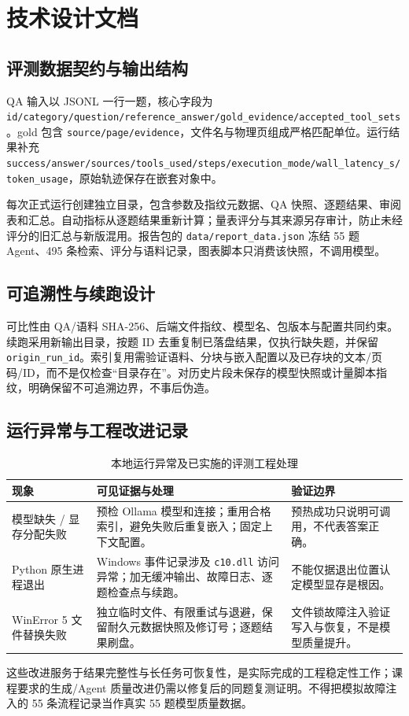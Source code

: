 \documentclass[UTF8,a4paper,zihao=-4,fontset=none]{ctexart}
\newcommand{\code}[1]{{\small\nolinkurl{#1}}}
\begin{document}
\section{技术设计文档}
\subsection{评测数据契约与输出结构}
QA 输入以 JSONL 一行一题，核心字段为 \code{id/category/question/reference_answer/gold_evidence/accepted_tool_sets}。gold 包含 \code{source/page/evidence}，文件名与物理页组成严格匹配单位。运行结果补充 \code{success/answer/sources/tools_used/steps/execution_mode/wall_latency_s/token_usage}，原始轨迹保存在嵌套对象中。

每次正式运行创建独立目录，包含参数及指纹元数据、QA 快照、逐题结果、审阅表和汇总。自动指标从逐题结果重新计算；量表评分与其来源另存审计，防止未经评分的旧汇总与新版混用。报告包的 \code{data/report_data.json} 冻结 55 题 Agent、495 条检索、评分与语料记录，图表脚本只消费该快照，不调用模型。

\subsection{可追溯性与续跑设计}
可比性由 QA/语料 SHA-256、后端文件指纹、模型名、包版本与配置共同约束。续跑采用新输出目录，按题 ID 去重复制已落盘结果，仅执行缺失题，并保留 \code{origin_run_id}。索引复用需验证语料、分块与嵌入配置以及已存块的文本/页码/ID，而不是仅检查“目录存在”。对历史片段未保存的模型快照或计量脚本指纹，明确保留不可追溯边界，不事后伪造。

\subsection{运行异常与工程改进记录}
\begin{table}[H]\caption{本地运行异常及已实施的评测工程处理}\small\centering
\begin{tabularx}{\linewidth}{@{}L{27mm}Y Y@{}}\toprule 现象 & 可见证据与处理 & 验证边界\\\midrule
模型缺失 / 显存分配失败 & 预检 Ollama 模型和连接；重用合格索引，避免失败后重复嵌入；固定上下文配置。 & 预热成功只说明可调用，不代表答案正确。\\
Python 原生进程退出 & Windows 事件记录涉及 \code{c10.dll} 访问异常；加无缓冲输出、故障日志、逐题检查点与续跑。 & 不能仅据退出位置认定模型显存是根因。\\
WinError 5 文件替换失败 & 独立临时文件、有限重试与退避，保留耐久元数据快照及修订号；逐题结果刷盘。 & 文件锁故障注入验证写入与恢复，不是模型质量提升。\\\bottomrule\end{tabularx}
\end{table}
这些改进服务于结果完整性与长任务可恢复性，是实际完成的工程稳定性工作；课程要求的生成/Agent 质量改进仍需以修复后的同题复测证明。不得把模拟故障注入的 55 条流程记录当作真实 55 题模型质量数据。
\end{document}
